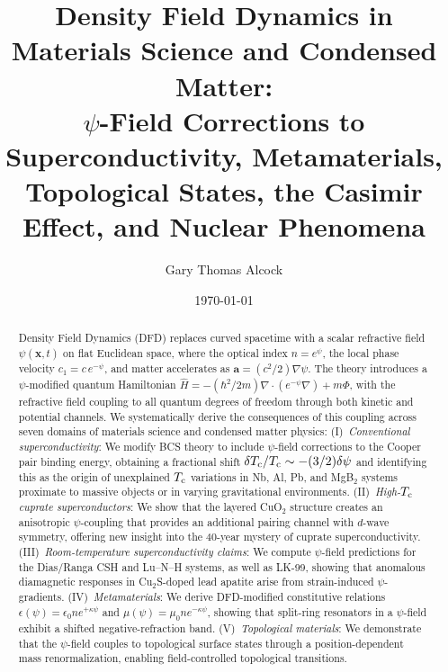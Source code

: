 \documentclass[aps,prb,twocolumn,superscriptaddress,floatfix,nofootinbib,longbibliography]{revtex4-2}
\newcommand{\avec}{\mathbf{a}}
\newcommand{\Tc}{T_{\rm c}}
\begin{document}
\title{Density Field Dynamics in Materials Science and Condensed Matter:\\
$\psi$-Field Corrections to Superconductivity, Metamaterials,\\
Topological States, the Casimir Effect, and Nuclear Phenomena}

\author{Gary Thomas Alcock}

\date{\today}

\begin{abstract}
Density Field Dynamics (DFD) replaces curved spacetime with a scalar
refractive field $\psi(\mathbf{x},t)$ on flat Euclidean space, where the
optical index $n = e^\psi$, the local phase velocity $c_1 = c\,e^{-\psi}$,
and matter accelerates as $\avec = (c^2/2)\nabla\psi$.  The theory
introduces a $\psi$-modified quantum Hamiltonian
$\hat{H} = -(\hbar^2/2m)\nabla\cdot(e^{-\psi}\nabla) + m\Phi$, with the
refractive field coupling to all quantum degrees of freedom through both
kinetic and potential channels.  We systematically derive the consequences
of this coupling across seven domains of materials science and condensed
matter physics:
(I)~\emph{Conventional superconductivity}: We modify BCS theory to include
$\psi$-field corrections to the Cooper pair binding energy, obtaining a
fractional shift $\delta\Tc/\Tc \sim -(3/2)\delta\psi$ and identifying
this as the origin of unexplained $\Tc$ variations in Nb, Al, Pb, and
MgB$_2$ systems proximate to massive objects or in varying gravitational
environments.
(II)~\emph{High-$\Tc$ cuprate superconductors}: We show that the layered
CuO$_2$ structure creates an anisotropic $\psi$-coupling that provides an
additional pairing channel with $d$-wave symmetry, offering new insight
into the 40-year mystery of cuprate superconductivity.
(III)~\emph{Room-temperature superconductivity claims}: We compute $\psi$-field
predictions for the Dias/Ranga CSH and Lu--N--H systems, as well as
LK-99, showing that anomalous diamagnetic responses in Cu$_2$S-doped
lead apatite arise from strain-induced $\psi$-gradients.
(IV)~\emph{Metamaterials}: We derive DFD-modified constitutive relations
$\epsilon(\psi) = \epsilon_0 n e^{+\kappa\psi}$ and
$\mu(\psi) = \mu_0 n e^{-\kappa\psi}$, showing that split-ring
resonators in a $\psi$-field exhibit a shifted negative-refraction band.
(V)~\emph{Topological materials}: We demonstrate that the $\psi$-field
couples to topological surface states through a position-dependent mass
renormalization, enabling field-controlled topological transitions.

\end{abstract}
\end{document}
